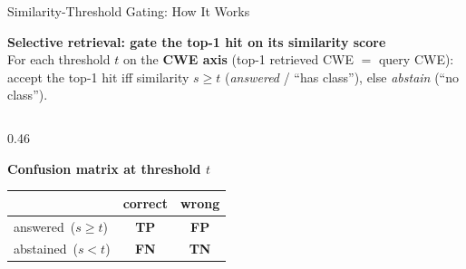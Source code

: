 \documentclass[aspectratio=169,10pt]{beamer}
\newcommand{\chit}[1]{\cellcolor{hit!30} #1}
\newcommand{\cmiss}[1]{\cellcolor{miss!25} #1}
\newcommand{\cwarn}[1]{\cellcolor{warn!30} #1}
\begin{document}
\begin{frame}{Similarity-Threshold Gating: How It Works}

  \begin{center}
    {\small\textbf{Selective retrieval: gate the top-1 hit on its similarity score}}\\[2pt]
    {\scriptsize For each threshold $t$ on the \textbf{CWE axis} (top-1 retrieved CWE $=$ query CWE): accept the top-1 hit iff similarity $s \ge t$ (\emph{answered} / ``has class''), else \emph{abstain} (``no class'').}
  \end{center}

  \vspace{0.4em}
  \begin{columns}[T]
    \begin{column}{0.46\textwidth}
      \begin{center}
        {\scriptsize\textbf{Confusion matrix at threshold $t$}}\\[4pt]
      {\small
      \renewcommand{\arraystretch}{1.4}
      \setlength{\tabcolsep}{8pt}
      \begin{tabular}{lcc}
        \toprule
         & \textbf{correct} & \textbf{wrong} \\
        \midrule
        answered\ {\scriptsize($s\!\ge\!t$)} & \chit{\textbf{TP}}  & \cmiss{\textbf{FP}} \\
        abstained\ {\scriptsize($s\!<\!t$)}  & \cwarn{\textbf{FN}} & \cellcolor{hit!15}\textbf{TN} \\
        \bottomrule
      \end{tabular}}
      \end{center}


\end{column}
\end{columns}
\end{frame}
\end{document}
